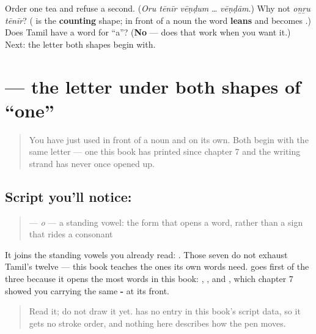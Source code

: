\begin{tcolorbox}[breakable,colback=teal!4,colframe=teal!35!black,title={Before you move on}]
Order one tea and refuse a second. (\emph{Oru tēnīr vēṇḍum} … \emph{vēṇḍām}.) Why not \emph{oṉṟu tēnīr}? (\textbf{} is the \textbf{counting} shape; in front of a noun the word \textbf{leans} and becomes \textbf{}.) Does Tamil have a word for \textquotedblleft{}a\textquotedblright{}? (\textbf{No} — \textbf{} does that work when you want it.) Next: the letter both shapes begin with.
\end{tcolorbox}
\section[\texorpdfstring{\ta{ஒன்று} (oṉṟu)}{ஒன்று (oṉṟu)}]{ — the letter under both shapes of \textquotedblleft{}one\textquotedblright{}}

\label{lesson:TA-W20-read-onru}



\begin{quote}
You have just used \textbf{} in front of a noun and \textbf{} on its own. Both begin with the same letter — one this book has printed since chapter 7 and the writing strand has never once opened up.
\end{quote}

\subsection*{Script you'll notice: }
\begin{quote}
\textbf{} — \emph{o} — a standing vowel: the form that opens a word, rather than a sign that rides a consonant
\end{quote}

It joins the standing vowels you already read: \textbf{     }. Those seven do not exhaust Tamil's twelve — this book teaches the ones its own words need. \textbf{} goes first of the three because it opens the most words in this book: \textbf{}, \textbf{}, and \textbf{}, which chapter 7 showed you carrying the same \textbf{-} at its front.

\begin{quote}
Read it; do not draw it yet. \textbf{} has no entry in this book's script data, so it gets no stroke order, and nothing here describes how the pen moves.
\end{quote}

